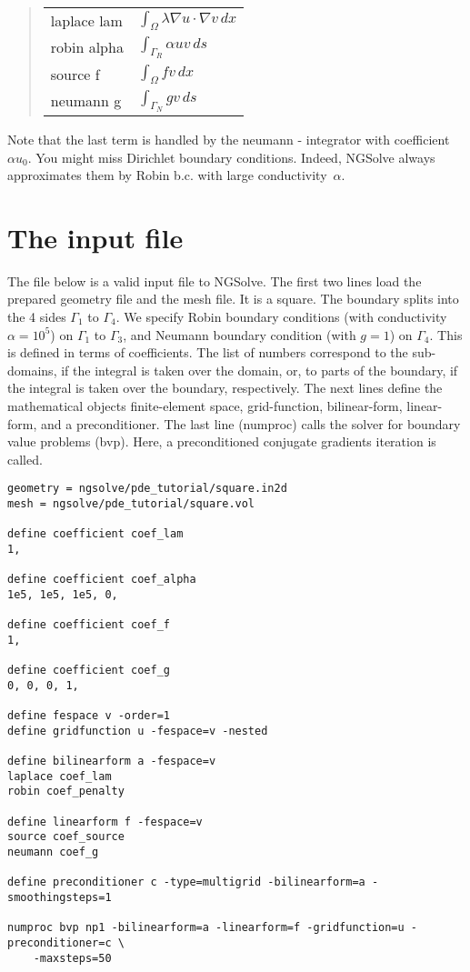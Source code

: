 \documentclass[12pt]{book}
\begin{document}
\begin{quote}
\begin{tabular}{|l|l|}
\hline
laplace lam &  $\int_\Omega \lambda \nabla u \cdot \nabla v \, dx$ \\
robin alpha & $\int_{\Gamma_R} \alpha u v \, ds$ \\
\hline
source f    & $\int_\Omega f v \, dx$ \\
neumann g   & $\int_{\Gamma_N} g v \, ds$ \\
\hline
\end{tabular}
\end{quote}

Note that the last term is handled by the neumann - integrator with
coefficient $\alpha u_0$. You might miss Dirichlet boundary
conditions. Indeed, NGSolve always approximates them by Robin
b.c. with large conductivity~$\alpha$.

\section{The input file}


The file below is a valid input file to NGSolve. The first two lines
load the prepared geometry file and the mesh file. It is a square. The
boundary splits into the 4 sides $\Gamma_1$ to $\Gamma_4$. We specify 
Robin boundary conditions (with conductivity $\alpha = 10^5$) on $\Gamma_1$
to $\Gamma_3$, and Neumann boundary condition (with $g = 1$) on $\Gamma_4$.
This is defined in terms of coefficients. The list of numbers correspond to
the sub-domains, if the integral is taken over the domain, or, to parts
of the boundary, if the integral is taken over the boundary, respectively.
The next lines define the mathematical objects finite-element space, 
grid-function, bilinear-form, linear-form, and a preconditioner. 
The last line (numproc) calls the solver for boundary value problems (bvp). Here,
a preconditioned conjugate gradients iteration is called.

\begin{verbatim}
geometry = ngsolve/pde_tutorial/square.in2d
mesh = ngsolve/pde_tutorial/square.vol

define coefficient coef_lam
1, 

define coefficient coef_alpha
1e5, 1e5, 1e5, 0, 

define coefficient coef_f
1,

define coefficient coef_g
0, 0, 0, 1,

define fespace v -order=1
define gridfunction u -fespace=v -nested

define bilinearform a -fespace=v
laplace coef_lam
robin coef_penalty

define linearform f -fespace=v
source coef_source
neumann coef_g

define preconditioner c -type=multigrid -bilinearform=a -smoothingsteps=1

numproc bvp np1 -bilinearform=a -linearform=f -gridfunction=u -preconditioner=c \
    -maxsteps=50
\end{verbatim}
\end{document}
